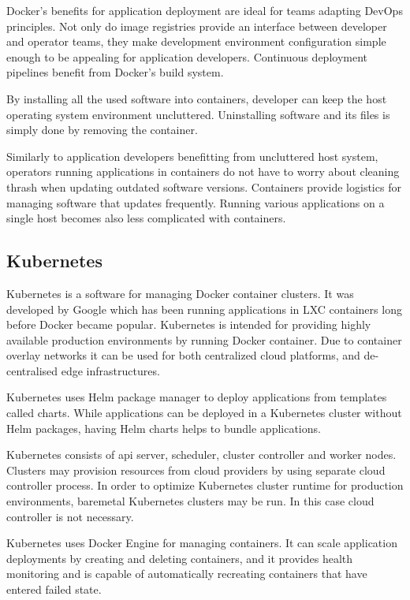 \documentclass[officiallayout]{tktla}
\begin{document}
Docker's benefits for application deployment are ideal for teams adapting
DevOps principles. Not only do image registries provide an interface between
developer and operator teams, they make development environment configuration
simple enough to be appealing for application developers. Continuous deployment
pipelines benefit from Docker's build system.

By installing all the used software into containers, developer can keep the
host operating system environment uncluttered. Uninstalling software and its
files is simply done by removing the container.

Similarly to application developers benefitting from uncluttered host system,
operators running applications in containers do not have to worry about
cleaning thrash when updating outdated software versions. Containers provide
logistics for managing software that updates frequently. Running various
applications on a single host becomes also less complicated with containers.

\subsection{Kubernetes}

Kubernetes \cite{kubernetes} is a software for managing Docker container
clusters. It was developed by Google which has been running applications in LXC
containers long before Docker became popular. Kubernetes is intended for
providing highly available production environments by running Docker container.
Due to container overlay networks it can be used for both centralized cloud
platforms, and de-centralised edge infrastructures.

Kubernetes uses Helm package manager to deploy applications from templates
called charts. While applications can be deployed in a Kubernetes cluster
without Helm packages, having Helm charts helps to bundle applications.

Kubernetes consists of api server, scheduler, cluster controller and worker
nodes. Clusters may provision resources from cloud providers by using separate
cloud controller process. In order to optimize Kubernetes cluster runtime for
production environments, baremetal Kubernetes clusters may be run. In this case
cloud controller is not necessary.

Kubernetes uses Docker Engine for managing containers. It can scale application
deployments by creating and deleting containers, and it provides health
monitoring and is capable of automatically recreating containers that have
entered failed state.
\end{document}
